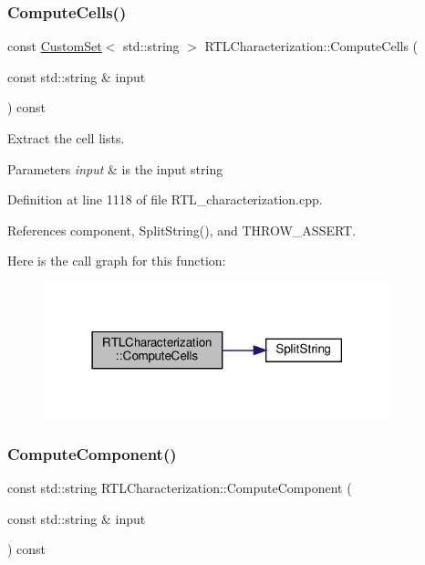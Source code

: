 \subsubsection{\texorpdfstring{Compute\+Cells()}{ComputeCells()}}
{\footnotesize\ttfamily const \hyperlink{custom__set_8hpp_a615bc2f42fc38a4bb1790d12c759e86f}{Custom\+Set}$<$ std\+::string $>$ R\+T\+L\+Characterization\+::\+Compute\+Cells (\begin{DoxyParamCaption}\item[{const std\+::string \&}]{input }\end{DoxyParamCaption}) const\hspace{0.3cm}{\ttfamily [private]}}



Extract the cell lists. 


\begin{DoxyParams}{Parameters}
{\em input} & is the input string \\
\hline
\end{DoxyParams}


Definition at line 1118 of file R\+T\+L\+\_\+characterization.\+cpp.



References component, Split\+String(), and T\+H\+R\+O\+W\+\_\+\+A\+S\+S\+E\+RT.

Here is the call graph for this function\+:
\nopagebreak
\begin{figure}[H]
\begin{center}
\leavevmode
\includegraphics[width=285pt]{d9/d84/classRTLCharacterization_a9f3427f34b9800e5bd6e3fa7a121908a_cgraph}
\end{center}
\end{figure}
\mbox{\label{classRTLCharacterization_ab22c0a668aea8294ea67188cc5e0846d}} 
\subsubsection{\texorpdfstring{Compute\+Component()}{ComputeComponent()}}
{\footnotesize\ttfamily const std\+::string R\+T\+L\+Characterization\+::\+Compute\+Component (\begin{DoxyParamCaption}\item[{const std\+::string \&}]{input }\end{DoxyParamCaption}) const\hspace{0.3cm}{\ttfamily [private]}}



